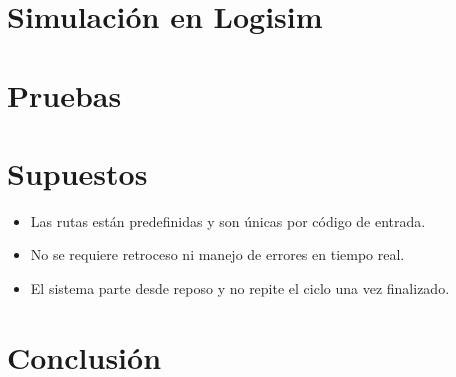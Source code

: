 \documentclass[12pt]{article}
\begin{document}
\section{Simulación en Logisim}

\section{Pruebas}

\section{Supuestos}
\begin{itemize}
    \item Las rutas están predefinidas y son únicas por código de entrada.
    \item No se requiere retroceso ni manejo de errores en tiempo real.
    \item El sistema parte desde reposo y no repite el ciclo una vez finalizado.
\end{itemize}

\section{Conclusión}
\end{document}
